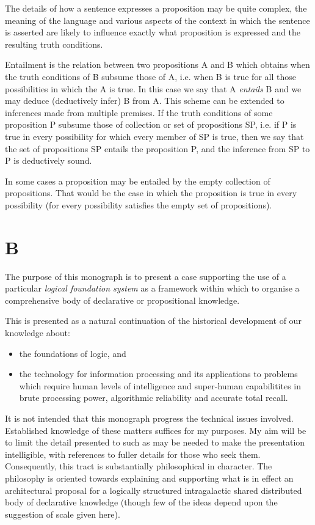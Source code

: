\documentclass[10pt,titlepage]{book}
\begin{document}
The details of how a sentence expresses a proposition may be quite complex, the meaning of the language and various aspects of the context in which the sentence is asserted are likely to influence exactly what proposition is expressed and the resulting truth conditions.

Entailment is the relation between two propositions A and B which obtains when the truth conditions of B subsume those of A, i.e. when B is true for all those possibilities in which the A is true.
In this case we say that A \emph{entails} B and we may deduce (deductively infer) B from A.
This scheme can be extended to inferences made from multiple premises.
If the truth conditions of some proposition P subsume those of collection or set of propositions SP, i.e. if P is true in every possibility for which every member of SP is true, then we say that the set of propositions SP entails the proposition P, and the inference from SP to P is deductively sound.

In some cases a proposition may be entailed by the empty collection of propositions.
That would be the case in which the proposition is true in every possibility (for every possibility satisfies the empty set of propositions).

\section{B}

The purpose of this monograph is to present a case supporting the use of a particular \emph{logical foundation system} as a framework within which to organise a comprehensive body of declarative or propositional knowledge.

This is presented as a natural continuation of the historical development of our knowledge about:
\begin{itemize}
\item the foundations of logic, and
\item the technology for information processing and its applications to problems which require human levels of intelligence and super-human capabilitites in brute processing power, algorithmic reliability and accurate total recall.
\end{itemize}

It is not intended that this monograph progress the technical issues involved.
Established knowledge of these matters suffices for my purposes.
My aim will be to limit the detail presented to such as may be needed to make the presentation intelligible, with references to fuller details for those who seek them.
Consequently, this tract is substantially philosophical in character.
The philosophy is oriented towards explaining and supporting what is in effect an architectural proposal for a  logically structured intragalactic shared distributed body of declarative knowledge (though few of the ideas depend upon the suggestion of scale given here).
\end{document}
